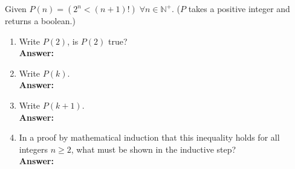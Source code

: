 \documentclass{exercise}
\newcommand{\answer}[1]{\vspace{0.25cm}\\\textbf{Answer:}~#1\vspace{0.25cm}}
\begin{document}
   Given $P(n) = (2^n < (n + 1)!)\;\forall n \in \mathbb{N}^{+}$. ($P$ takes a positive integer and returns a boolean.)
    \begin{enumerate}
      \item Write $P(2)$, is $P(2)$ true?
      \answer{

      }
      
      \item Write $P(k)$.
      \answer{

      }
      
      \item Write $P(k+1)$.
      \answer{

      }
      
      \item In a proof by mathematical induction that this inequality holds for all integers $n \geq 2$, what must be shown in the inductive step?
      \answer{

      }

    \end{enumerate}
\end{document}
